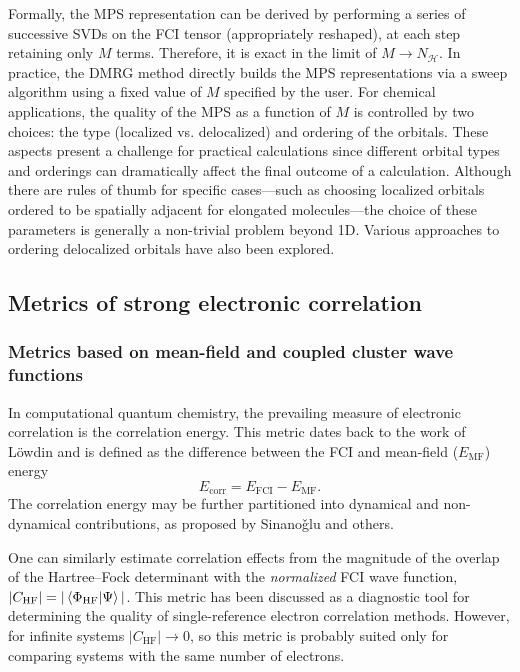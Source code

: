 \documentclass[aip,jcp,amsmath,amssymb, reprint]{revtex4-1}
\newcommand*{\nfci}{N_\mathcal{H}}
\begin{document}
Formally, the MPS representation can be derived by performing a series of successive SVDs on the FCI tensor (appropriately reshaped), at each step retaining only $M$ terms.
Therefore, it is exact in the limit of $M \rightarrow \nfci$.
In practice, the DMRG method directly builds the MPS representations via a sweep algorithm using a fixed value of $M$ specified by the user.
For chemical applications, the quality of the MPS as a function of $M$ is controlled by two choices: the type (localized vs. delocalized) and ordering of the orbitals. These aspects present a challenge for practical calculations since different orbital types and orderings can dramatically affect the final outcome of a calculation. Although there are rules of thumb for specific cases---such as choosing localized orbitals ordered to be spatially adjacent for elongated molecules\cite{Wouters2014TheDensity}---the choice of these parameters is generally a non-trivial problem beyond 1D. 
Various approaches to ordering delocalized orbitals have also been explored.\cite{legeza2003controlling,moritz2005convergence,Legeza2003OptemizingThe,Rissler2006MeasuringOrbital}


\subsection{\label{metrics_of_correlation}Metrics of strong electronic correlation}

\subsubsection{Metrics based on mean-field and coupled cluster wave functions}

In computational quantum chemistry, the prevailing measure of electronic correlation is the correlation energy. This metric dates back to the work of L{\"o}wdin \cite{lowdin1958correlation} and is defined as the difference between the FCI and mean-field ($E_{\text{MF}}$) energy
\begin{equation}
E_{\text{corr}} = E_{\text{FCI}} - E_{\text{MF}}.
\label{eq:cor_energy}
\end{equation}
The correlation energy may be further partitioned into dynamical and non-dynamical contributions, as proposed by Sinano{\v g}lu and others.\cite{Sinanoglu1964QuantumTheory,bartlett1994applications}

One can similarly estimate correlation effects from the magnitude of the overlap of the Hartree--Fock determinant with the \textit{normalized} FCI wave function, $|C_\mathrm{HF}| = |\braket{\Phi_{\mathrm{HF}}|\Psi}|$.
This metric has been discussed as a diagnostic tool for determining the quality of single-reference electron correlation methods.\cite{lee1989diagnostic}
However, for infinite systems $|C_\mathrm{HF}| \rightarrow 0$, so this metric is probably suited only for comparing systems with the same number of electrons.
\end{document}
